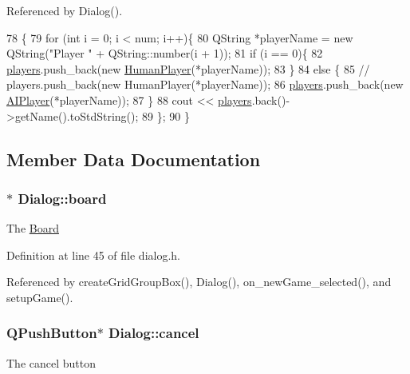 Referenced by Dialog().


\begin{DoxyCode}
78 \{
79     \textcolor{keywordflow}{for} (\textcolor{keywordtype}{int} i = 0; i < num; i++)\{
80         QString *playerName = \textcolor{keyword}{new} QString(\textcolor{stringliteral}{"Player "} + QString::number(i + 1));
81         \textcolor{keywordflow}{if} (i == 0)\{
82             \hyperlink{class_dialog_a93e79b9554adff375010cc56a29c82b0}{players}.push\_back(\textcolor{keyword}{new} \hyperlink{class_human_player}{HumanPlayer}(*playerName));
83         \}
84         \textcolor{keywordflow}{else} \{
85             \textcolor{comment}{// players.push\_back(new HumanPlayer(*playerName));}
86             \hyperlink{class_dialog_a93e79b9554adff375010cc56a29c82b0}{players}.push\_back(\textcolor{keyword}{new} \hyperlink{class_a_i_player}{AIPlayer}(*playerName));
87         \}
88         cout << \hyperlink{class_dialog_a93e79b9554adff375010cc56a29c82b0}{players}.back()->getName().toStdString();
89     \};
90 \}
\end{DoxyCode}


\subsection{Member Data Documentation}
\hypertarget{class_dialog_a0a45509f1cb59a221eb09f16e1ca4923}{
\subsubsection[{board}]{$\ast$ Dialog\-::board\hspace{0.3cm}{\ttfamily [private]}}}\label{class_dialog_a0a45509f1cb59a221eb09f16e1ca4923}
The \hyperlink{class_board}{Board} 

Definition at line 45 of file dialog.\-h.



Referenced by create\-Grid\-Group\-Box(), Dialog(), on\-\_\-new\-Game\-\_\-selected(), and setup\-Game().

\hypertarget{class_dialog_aa353f9ab09ea36fb2fdc5e5964b9b2b4}{
\subsubsection[{cancel}]{\setlength{\rightskip}{0pt plus 5cm}Q\-Push\-Button$\ast$ Dialog\-::cancel\hspace{0.3cm}{\ttfamily [private]}}}\label{class_dialog_aa353f9ab09ea36fb2fdc5e5964b9b2b4}
The cancel button 

